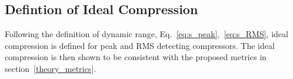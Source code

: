 \documentclass[../main2.tex]{subfiles}
\providecommand{\rootdir}{..}
\begin{document}
\FloatBarrier
\subsection{Defintion of Ideal Compression}\label{method_ideal_peak_compression}
Following the definition of dynamic range, Eq.~\eqref{eq:s_peak},~\eqref{eq:s_RMS}, ideal compression is defined for peak and RMS detecting compressors. The ideal compression is then shown to be consistent with the proposed metrics in section~\ref{theory_metrics}.

%

\end{document}
